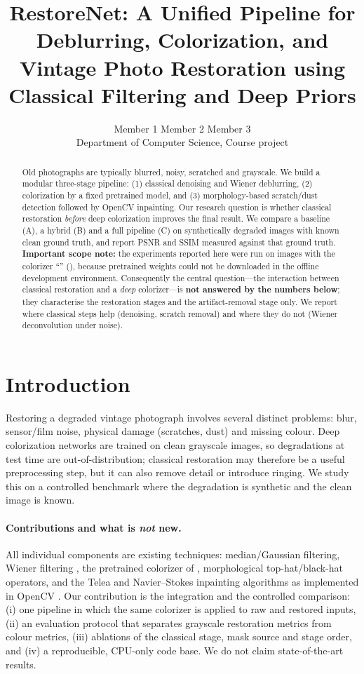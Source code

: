 \documentclass[10pt]{article}
\title{RestoreNet: A Unified Pipeline for Deblurring, Colorization, and Vintage Photo Restoration using Classical Filtering and Deep Priors}
\author{Member 1 \quad Member 2 \quad Member 3\\ Department of Computer Science, Course project}
\date{}
\begin{document}
\maketitle

\begin{abstract}
Old photographs are typically blurred, noisy, scratched and grayscale. We build a modular three-stage pipeline: (1) classical
denoising and Wiener deblurring, (2) colorization by a fixed pretrained model, and (3) morphology-based scratch/dust
detection followed by OpenCV inpainting. Our research question is whether classical restoration \emph{before} deep colorization
improves the final result. We compare a baseline (A), a hybrid (B) and a full pipeline (C) on synthetically degraded images
with known clean ground truth, and report PSNR and SSIM measured against that ground truth. \textbf{Important scope note:}
the experiments reported here were run on \NImages{} images with the colorizer ``\ColorizerName'' (\ColorizerKind),
because pretrained weights could not be downloaded in the offline development environment. Consequently the central
question---the interaction between classical restoration and a \emph{deep} colorizer---is \textbf{not answered by the
numbers below}; they characterise the restoration stages and the artifact-removal stage only. We report where classical steps help
(denoising, scratch removal) and where they do not (Wiener deconvolution under noise).
\end{abstract}

\section{Introduction}
Restoring a degraded vintage photograph involves several distinct problems: blur, sensor/film noise, physical damage
(scratches, dust) and missing colour. Deep colorization networks are trained on clean grayscale images, so degradations
at test time are out-of-distribution; classical restoration may therefore be a useful preprocessing step, but it can also remove
detail or introduce ringing. We study this on a controlled benchmark where the degradation is synthetic and the clean image is known.

\paragraph{Contributions and what is \emph{not} new.} All individual components are existing techniques: median/Gaussian filtering,
Wiener filtering \citep{wiener1949extrapolation,gonzalez2018digital}, the pretrained colorizer of \citet{zhang2016colorful},
morphological top-hat/black-hat operators, and the Telea \citep{telea2004inpainting} and Navier--Stokes \citep{bertalmio2001navier} inpainting
algorithms as implemented in OpenCV \citep{bradski2000opencv}. Our contribution is the integration and the controlled
comparison: (i) one pipeline in which the same colorizer is applied to raw and restored inputs, (ii) an evaluation protocol that separates
grayscale restoration metrics from colour metrics, (iii) ablations of the classical stage, mask source and stage order, and (iv) a reproducible,
CPU-only code base. We do not claim state-of-the-art results.
\end{document}
